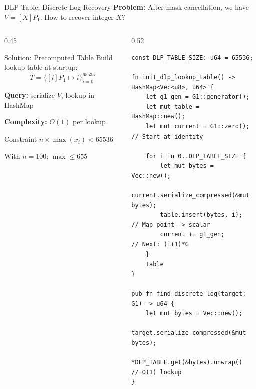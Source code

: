 \documentclass[aspectratio=169,10pt]{beamer}
\begin{document}
\begin{frame}[fragile]{DLP Table: Discrete Log Recovery}
    \textbf{Problem:} After mask cancellation, we have $V = [X]P_1$. How to recover integer $X$?

    \vspace{0.3em}

    \begin{columns}[T]
        \begin{column}{0.45\textwidth}
            \begin{block}{Solution: Precomputed Table}
                Build lookup table at startup:
                \[
                T = \{[i]P_1 \mapsto i\}_{i=0}^{65535}
                \]

                \textbf{Query:} serialize $V$, lookup in HashMap

                \textbf{Complexity:} $O(1)$ per lookup
            \end{block}

            \vspace{0.2em}
            \begin{alertblock}{Constraint}
                $n \times \max(x_i) < 65536$

                With $n=100$: $\max \leq 655$
            \end{alertblock}
        \end{column}
        \begin{column}{0.52\textwidth}
\begin{lstlisting}[style=rust]
const DLP_TABLE_SIZE: u64 = 65536;

fn init_dlp_lookup_table() -> HashMap<Vec<u8>, u64> {
    let g1_gen = G1::generator();
    let mut table = HashMap::new();
    let mut current = G1::zero();  // Start at identity

    for i in 0..DLP_TABLE_SIZE {
        let mut bytes = Vec::new();
        current.serialize_compressed(&mut bytes);
        table.insert(bytes, i);  // Map point -> scalar
        current += g1_gen;       // Next: (i+1)*G
    }
    table
}

pub fn find_discrete_log(target: G1) -> u64 {
    let mut bytes = Vec::new();
    target.serialize_compressed(&mut bytes);
    *DLP_TABLE.get(&bytes).unwrap()  // O(1) lookup
}
\end{lstlisting}
        \end{column}
    \end{columns}
\end{frame}
\end{document}

